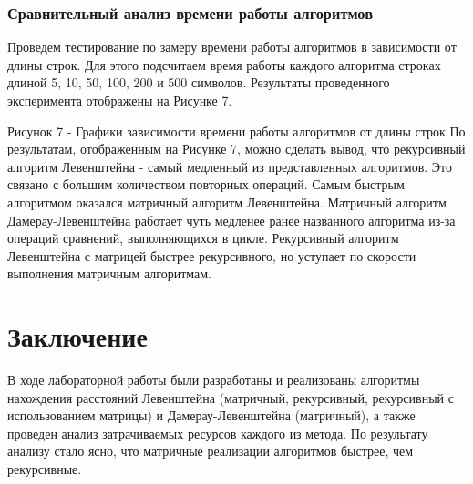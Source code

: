 \documentclass[12pt]{report}
\begin{document}
\subsection{Сравнительный анализ времени работы алгоритмов}
Проведем тестирование по замеру времени работы алгоритмов в зависимости от длины строк. Для этого подсчитаем время работы каждого алгоритма строках длиной 5, 10, 50, 100, 200 и 500 символов. Результаты проведенного эксперимента отображены на Рисунке 7.

{}

Рисунок 7 - Графики зависимости времени работы алгоритмов от длины строк
\newline\newline
По результатам, отображенным на Рисунке 7, можно сделать вывод, что рекурсивный алгоритм Левенштейна - самый медленный из представленных алгоритмов. Это связано с большим количеством повторных операций. Самым быстрым алгоритмом оказался  матричный алгоритм Левенштейна. Матричный алгоритм Дамерау-Левенштейна работает чуть медленее ранее названного алгоритма из-за операций сравнений, выполняющихся в цикле. Рекурсивный алгоритм Левенштейна с матрицей быстрее рекурсивного, но уступает по скорости выполнения матричным алгоритмам. 

\chapter*{Заключение}
В ходе лабораторной работы были разработаны и реализованы алгоритмы нахождения расстояний
Левенштейна (матричный, рекурсивный, рекурсивный с использованием матрицы) и Дамерау-Левенштейна (матричный), а также проведен анализ затрачиваемых ресурсов каждого из метода. По результату анализу стало ясно, что матричные реализации алгоритмов быстрее, чем рекурсивные.
\end{document}
